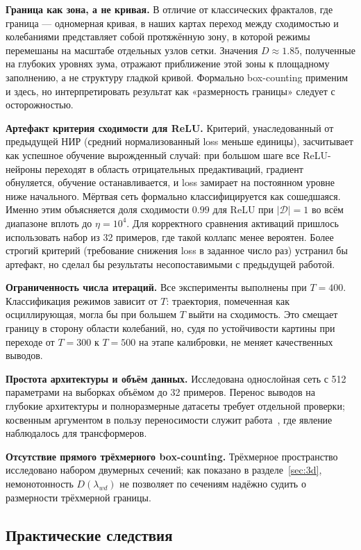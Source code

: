 \textbf{Граница как зона, а не кривая.} В отличие от классических фракталов,
где граница --- одномерная кривая, в наших картах переход между сходимостью и
колебаниями представляет собой протяжённую зону, в которой режимы перемешаны
на масштабе отдельных узлов сетки. Значения $D\approx1.85$, полученные на
глубоких уровнях зума, отражают приближение этой зоны к площадному заполнению,
а не структуру гладкой кривой. Формально box-counting применим и здесь, но
интерпретировать результат как «размерность границы» следует с осторожностью.

\textbf{Артефакт критерия сходимости для ReLU.} Критерий, унаследованный от
предыдущей НИР (средний нормализованный loss меньше единицы), засчитывает как
успешное обучение вырожденный случай: при большом шаге все ReLU-нейроны
переходят в область отрицательных предактиваций, градиент обнуляется, обучение
останавливается, и loss замирает на постоянном уровне ниже начального. Мёртвая
сеть формально классифицируется как сошедшаяся. Именно этим объясняется доля
сходимости $0.99$ для ReLU при $|\mathcal{D}|=1$ во всём диапазоне вплоть до
$\eta = 10^{4}$. Для корректного сравнения активаций пришлось использовать
набор из 32 примеров, где такой коллапс менее вероятен. Более строгий критерий
(требование снижения loss в заданное число раз) устранил бы артефакт, но
сделал бы результаты несопоставимыми с предыдущей работой.

\textbf{Ограниченность числа итераций.} Все эксперименты выполнены при
$T = 400$. Классификация режимов зависит от $T$: траектория, помеченная как
осциллирующая, могла бы при большем $T$ выйти на сходимость. Это смещает
границу в сторону области колебаний, но, судя по устойчивости картины при
переходе от $T=300$ к $T=500$ на этапе калибровки, не меняет качественных
выводов.

\textbf{Простота архитектуры и объём данных.} Исследована однослойная сеть с
512 параметрами на выборках объёмом до 32 примеров. Перенос выводов на
глубокие архитектуры и полноразмерные датасеты требует отдельной проверки;
косвенным аргументом в пользу переносимости служит работа~\cite{torkamandi2025},
где явление наблюдалось для трансформеров.

\textbf{Отсутствие прямого трёхмерного box-counting.} Трёхмерное пространство
исследовано набором двумерных сечений; как показано в разделе~\ref{sec:3d},
немонотонность $D(\lambda_{wd})$ не позволяет по сечениям надёжно судить о
размерности трёхмерной границы.

\subsection{Практические следствия}

